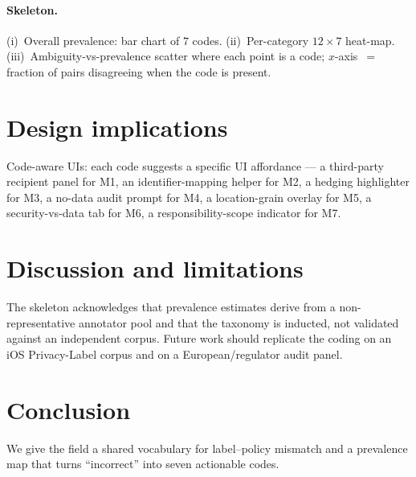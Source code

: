 \documentclass[11pt,a4paper]{article}
\begin{document}
\paragraph{Skeleton.} (i)~Overall prevalence: bar chart of $7$ codes.
(ii)~Per-category $12\times 7$ heat-map. (iii)~Ambiguity-vs-prevalence
scatter where each point is a code; $x$-axis~$=$ fraction of pairs
disagreeing when the code is present.

\section{Design implications}\label{sec:design}
Code-aware UIs: each code suggests a specific UI affordance --- a third-party
recipient panel for M1, an identifier-mapping helper for M2, a hedging
highlighter for M3, a no-data audit prompt for M4, a location-grain
overlay for M5, a security-vs-data tab for M6, a responsibility-scope
indicator for M7.

\section{Discussion and limitations}\label{sec:disc}
The skeleton acknowledges that prevalence estimates derive from a
non-representative annotator pool and that the taxonomy is inducted,
not validated against an independent corpus. Future work should
replicate the coding on an iOS Privacy-Label corpus and on a
European/regulator audit panel.

\section{Conclusion}\label{sec:concl}
We give the field a shared vocabulary for label--policy mismatch and a
prevalence map that turns ``incorrect'' into seven actionable codes.


\end{document}
